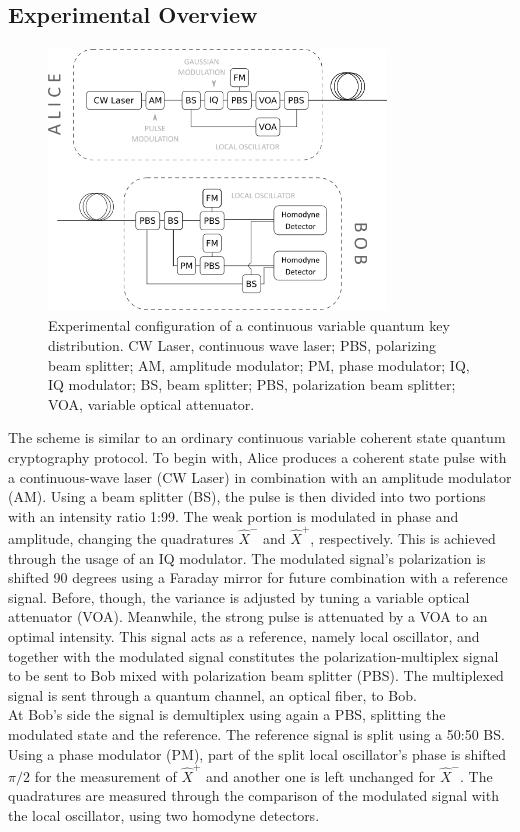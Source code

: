 \begin{refsection}
\subsection{Experimental Overview}
	\begin{figure}[H]
	\centering
	\includegraphics[width=0.8\textwidth,height=7cm]{./sdf/qkd_with_cv_without_base_switching/figures/setup.png}
	\caption{Experimental configuration of a continuous variable quantum key distribution. CW Laser, continuous wave laser; PBS, polarizing beam splitter; AM, amplitude modulator; PM, phase modulator; IQ, IQ modulator; BS, beam splitter; PBS, polarization beam splitter; VOA, variable optical attenuator.\label{fig:qkdwbs setup}}
\end{figure}

The scheme is similar to an ordinary continuous variable coherent state quantum cryptography protocol. To begin with, Alice produces a coherent state pulse with a continuous-wave laser (CW Laser) in combination with an amplitude modulator (AM). Using a beam splitter (BS), the pulse is then divided into two portions with an intensity ratio 1:99. The weak portion is modulated in phase and amplitude, changing the quadratures $\hat{X}^-$ and $\hat{X}^+$, respectively. This is achieved through the usage of an IQ modulator. The modulated signal's polarization is shifted 90 degrees using a Faraday mirror for future combination with a reference signal. Before, though, the variance is adjusted by tuning a variable optical attenuator (VOA). Meanwhile, the strong pulse is attenuated by a VOA to an optimal intensity. This signal acts as a reference, namely local oscillator, and together with the modulated signal constitutes the polarization-multiplex signal to be sent to Bob mixed with polarization beam splitter (PBS). The multiplexed signal is sent through a quantum channel, an optical fiber, to Bob.\\ At Bob's side the signal is demultiplex using again a PBS, splitting the modulated state and the reference. The reference signal is split using a 50:50 BS. Using a phase modulator (PM), part of the split local oscillator's phase is shifted $\pi/2$ for the measurement of $\hat{X}^+$ and another one is left unchanged for $\hat{X}^-$. The quadratures are measured through the comparison of the modulated signal with the local oscillator, using two homodyne detectors.
  

\end{refsection}
